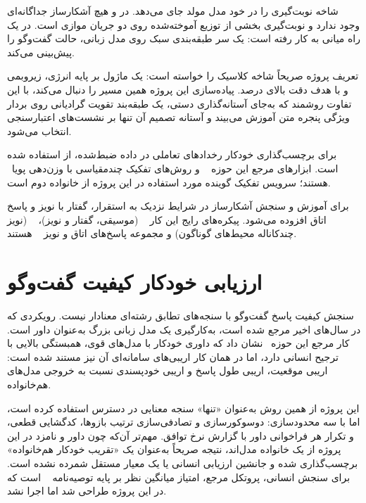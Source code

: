 شاخه  نوبت‌گیری را در خود مدل مولد جای می‌دهد. در
 و  هیچ آشکارساز جداگانه‌ای وجود ندارد و نوبت‌گیری بخشی
از توزیع آموخته‌شده روی دو جریان موازی است. در  یک راه
میانی به کار رفته است: یک سر طبقه‌بندی سبک روی مدل زبانی، حالت گفت‌وگو را
پیش‌بینی می‌کند.

تعریف پروژه صریحاً شاخه کلاسیک را خواسته است: یک ماژول بر پایه انرژی،
زیر‌و‌بمی و  با هدف دقت بالای  درصد. پیاده‌سازی این پروژه
همین مسیر را دنبال می‌کند، با این تفاوت روشمند که به‌جای آستانه‌گذاری
دستی، یک طبقه‌بند تقویت گرادیانی روی بردار ویژگی پنجره متن آموزش می‌بیند و
آستانه تصمیم آن تنها بر نشست‌های اعتبارسنجی انتخاب می‌شود.

برای برچسب‌گذاری خودکار رخدادهای تعاملی در داده ضبط‌شده، از
 استفاده شده است. ابزارهای مرجع این حوزه
~\cite{bredin2020pyannote} و روش‌های تفکیک چند‌مقیاسی با
وزن‌دهی پویا~\cite{park2022msdd} هستند؛ سرویس تفکیک گوینده مورد استفاده در
این پروژه از خانواده دوم است.

برای آموزش و سنجش آشکارساز در شرایط نزدیک به استقرار، گفتار با نویز و پاسخ
اتاق افزوده می‌شود. پیکره‌های رایج این کار ~\cite{snyder2015musan}
(موسیقی، گفتار و نویز)، ~\cite{thiemann2013demand} (نویز
چندکاناله محیط‌های گوناگون) و مجموعه پاسخ‌های اتاق و نویز
~\cite{ko2017rir} هستند.

\section{ارزیابی خودکار کیفیت گفت‌وگو}
\label{sec:eval-lit}

سنجش کیفیت پاسخ گفت‌وگو با سنجه‌های تطابق رشته‌ای معنادار نیست. رویکردی که
در سال‌های اخیر مرجع شده است، به‌کارگیری یک مدل زبانی بزرگ به‌عنوان داور
است. کار مرجع این حوزه~\cite{zheng2023mtbench} نشان داد که داوری خودکار با
مدل‌های قوی، همبستگی بالایی با ترجیح انسانی دارد، اما در همان کار
اریبی‌های سامانه‌ای آن نیز مستند شده است: اریبی موقعیت، اریبی طول پاسخ و
اریبی خودپسندی نسبت به خروجی مدل‌های هم‌خانواده.

این پروژه از همین روش به‌عنوان «تنها» سنجه معنایی در دسترس استفاده
کرده است، اما با سه محدودسازی: دوسوکورسازی و تصادفی‌سازی ترتیب بازوها،
کدگشایی قطعی، و تکرار هر فراخوانی داور با گزارش نرخ توافق. مهم‌تر آن‌که
چون داور و نامزد در این پروژه از یک خانواده مدل‌اند، نتیجه صریحاً به‌عنوان
یک «تقریب خودکار هم‌خانواده» برچسب‌گذاری شده و جانشین ارزیابی انسانی یا
یک معیار مستقل شمرده نشده است. برای سنجش انسانی، پروتکل مرجع، امتیاز
میانگین نظر بر پایه توصیه‌نامه ~\cite{itu1996p800} است که در
این پروژه طراحی شد اما اجرا نشد.

